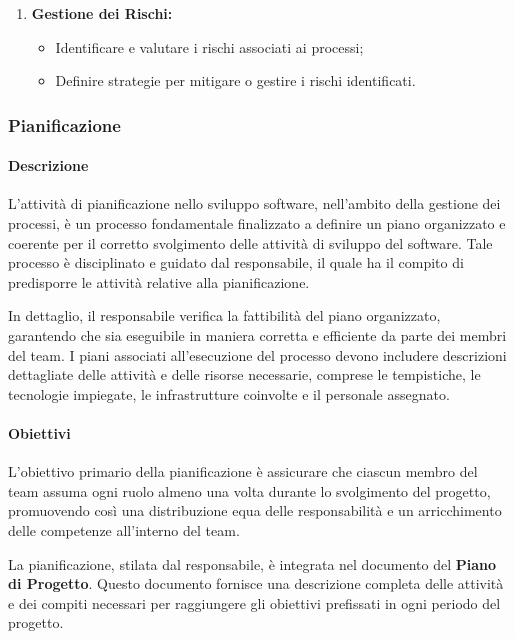 \begin{enumerate}
    \item \textbf{Gestione dei Rischi:}
      \begin{itemize}
        \item Identificare e valutare i rischi associati ai processi;
        \item Definire strategie per mitigare o gestire i rischi identificati.
      \end{itemize}
  \end{enumerate}
  
\subsubsection{Pianificazione}

\paragraph{Descrizione}
L'attività di pianificazione nello sviluppo software, nell'ambito della gestione dei processi, è un processo fondamentale finalizzato a definire un piano organizzato e coerente per il corretto svolgimento delle attività di sviluppo del software. Tale processo è disciplinato e guidato dal responsabile, il quale ha il compito di predisporre le attività relative alla pianificazione.

In dettaglio, il responsabile verifica la fattibilità del piano organizzato, garantendo che sia eseguibile in maniera corretta e efficiente da parte dei membri del team. I piani associati all'esecuzione del processo devono includere descrizioni dettagliate delle attività e delle risorse necessarie, comprese le tempistiche, le tecnologie impiegate, le infrastrutture coinvolte e il personale assegnato.

\paragraph{Obiettivi}

L'obiettivo primario della pianificazione è assicurare che ciascun membro del team assuma ogni ruolo almeno una volta durante lo svolgimento del progetto, promuovendo così una distribuzione equa delle responsabilità e un arricchimento delle competenze all'interno del team.

\vspace{0,1cm}

La pianificazione, stilata dal responsabile, è integrata nel documento del \textbf{Piano di Progetto}. Questo documento fornisce una descrizione completa delle attività e dei compiti necessari per raggiungere gli obiettivi prefissati in ogni periodo del progetto.
